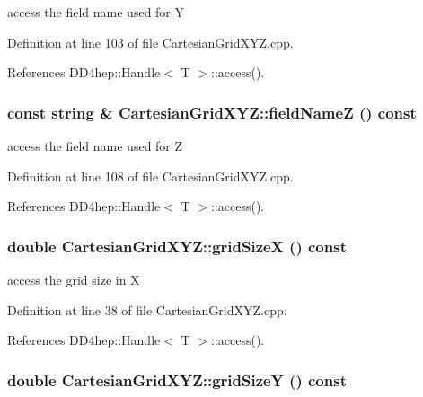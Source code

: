 access the field name used for Y 

Definition at line 103 of file CartesianGridXYZ.cpp.

References DD4hep::Handle$<$ T $>$::access().\hypertarget{class_d_d4hep_1_1_geometry_1_1_cartesian_grid_x_y_z_ae2ff56fa8c391e68491f54bd23de895a}{
\subsubsection[{fieldNameZ}]{\setlength{\rightskip}{0pt plus 5cm}const {\bf string} \& CartesianGridXYZ::fieldNameZ () const}}
\label{class_d_d4hep_1_1_geometry_1_1_cartesian_grid_x_y_z_ae2ff56fa8c391e68491f54bd23de895a}


access the field name used for Z 

Definition at line 108 of file CartesianGridXYZ.cpp.

References DD4hep::Handle$<$ T $>$::access().\hypertarget{class_d_d4hep_1_1_geometry_1_1_cartesian_grid_x_y_z_a58daa680e61ef2805819c8cb2674ca7b}{
\subsubsection[{gridSizeX}]{\setlength{\rightskip}{0pt plus 5cm}double CartesianGridXYZ::gridSizeX () const}}
\label{class_d_d4hep_1_1_geometry_1_1_cartesian_grid_x_y_z_a58daa680e61ef2805819c8cb2674ca7b}


access the grid size in X 

Definition at line 38 of file CartesianGridXYZ.cpp.

References DD4hep::Handle$<$ T $>$::access().\hypertarget{class_d_d4hep_1_1_geometry_1_1_cartesian_grid_x_y_z_a17a5b8021969c68770ac29b5098609e8}{
\subsubsection[{gridSizeY}]{\setlength{\rightskip}{0pt plus 5cm}double CartesianGridXYZ::gridSizeY () const}}
\label{class_d_d4hep_1_1_geometry_1_1_cartesian_grid_x_y_z_a17a5b8021969c68770ac29b5098609e8}


